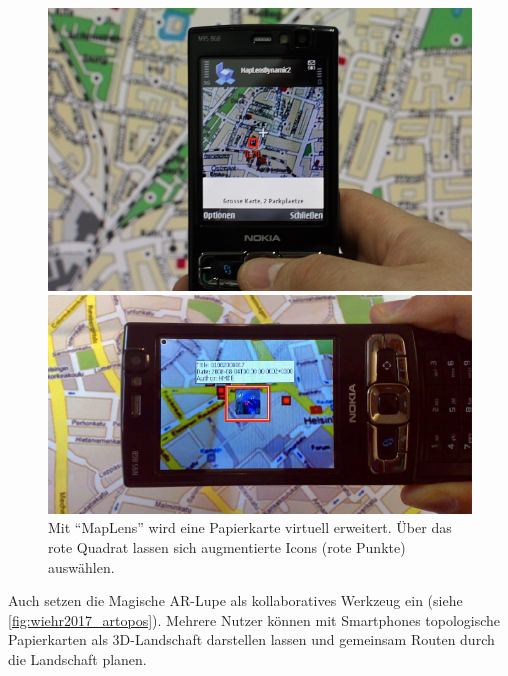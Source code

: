 \begin{figure}[h]
\begin{minipage}[t]{0.48\textwidth}
    \centering
    \includegraphics[width=\textwidth, height=0.225\textheight]{figures/rohs2009_ar_map.png}
    \caption{%
        Eine physische Karte wird mittels eines Kamerahandys um Preise für Parkplätze angereichert.
    }
    \label{fig:rohs2009_ar_map}
\end{minipage}%
\hfill
\begin{minipage}[t]{0.48\textwidth}
    \centering
    \includegraphics[width=\textwidth, height=0.225\textheight]{figures/morrison2009_ar_game.png}
    \caption{%
        Mit \enquote{MapLens} wird eine Papierkarte virtuell erweitert. %
        Über das rote Quadrat lassen sich augmentierte Icons (rote Punkte) auswählen. %
    }
    \label{fig:morrison2009_ar_game}
\end{minipage}
\end{figure}

Auch \textcite{Wiehr2017} setzen die Magische AR-Lupe als kollaboratives Werkzeug ein (siehe \autoref{fig:wiehr2017_artopos}).
Mehrere Nutzer können mit Smartphones topologische Papierkarten als 3D-Landschaft darstellen lassen und gemeinsam Routen durch die Landschaft planen.

